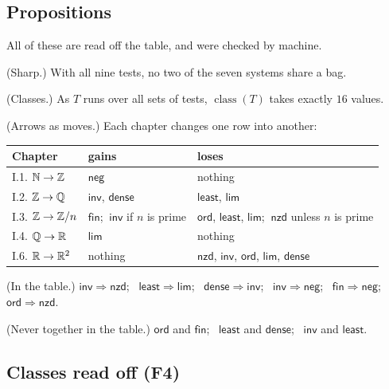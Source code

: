 \subsection*{Propositions}

All of these are read off the table, and were checked by machine.
\begin{lines}
\item[\lab{P1}] (Sharp.) With all nine tests, no two of the seven systems share a bag.
\item[\lab{P2}] (Classes.) As $T$ runs over all sets of tests, $\operatorname{class}(T)$ takes exactly $16$ values.
\item[\lab{P3}] (Arrows as moves.) Each chapter changes one row into another:
\begin{center}
\renewcommand{\arraystretch}{1.2}
\begin{tabular}{lll}
Chapter & gains & loses \\ \hline
I.1. $\mathbb{N} \to \mathbb{Z}$ & $\mathsf{neg}$ & nothing \\
I.2. $\mathbb{Z} \to \mathbb{Q}$ & $\mathsf{inv}$, $\mathsf{dense}$ & $\mathsf{least}$, $\mathsf{lim}$ \\
I.3. $\mathbb{Z} \to \mathbb{Z}/n$ & $\mathsf{fin}$; $\ \mathsf{inv}$ if $n$ is prime & $\mathsf{ord}$, $\mathsf{least}$, $\mathsf{lim}$; $\ \mathsf{nzd}$ unless $n$ is prime \\
I.4. $\mathbb{Q} \to \mathbb{R}$ & $\mathsf{lim}$ & nothing \\
I.6. $\mathbb{R} \to \mathbb{R}^2$ & nothing & $\mathsf{nzd}$, $\mathsf{inv}$, $\mathsf{ord}$, $\mathsf{lim}$, $\mathsf{dense}$ \\
\end{tabular}
\end{center}
\item[\lab{P4}] (In the table.) $\mathsf{inv} \Rightarrow \mathsf{nzd}$; \ $\mathsf{least} \Rightarrow \mathsf{lim}$; \ $\mathsf{dense} \Rightarrow \mathsf{inv}$; \ $\mathsf{inv} \Rightarrow \mathsf{neg}$; \ $\mathsf{fin} \Rightarrow \mathsf{neg}$; \ $\mathsf{ord} \Rightarrow \mathsf{nzd}$.
\item[\lab{P5}] (Never together in the table.) $\mathsf{ord}$ and $\mathsf{fin}$; \ $\mathsf{least}$ and $\mathsf{dense}$; \ $\mathsf{inv}$ and $\mathsf{least}$.
\end{lines}

\subsection*{Classes read off (F4)}

